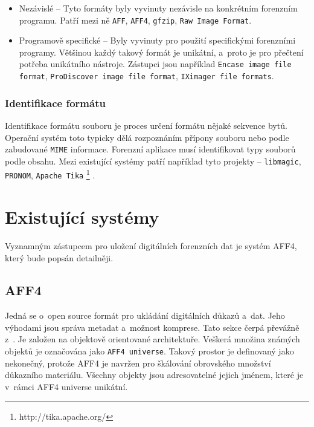 \begin{itemize}
\item Nezávislé -- Tyto formáty byly vyvinuty nezávisle na konkrétním forenzním programu. Patří mezi ně \texttt{AFF}, \texttt{AFF4}, \texttt{gfzip}, \texttt{Raw Image Format}.

\item Programově specifické -- Byly vyvinuty pro použití specifickými forenzními programy. Většinou každý takový formát je unikátní, a~proto je pro přečtení potřeba unikátního nástroje.
Zástupci jsou například \texttt{Encase image file format}, \texttt{ProDiscover image file format}, \texttt{IXimager file formats}.
\end{itemize}

\subsubsection{Identifikace formátu}
Identifikace formátu souboru je proces určení formátu nějaké sekvence bytů. Operační systém toto typicky dělá rozpoznáním přípony souboru nebo podle zabudované \texttt{MIME} informace. Forenzní aplikace musí identifikovat typy souborů podle obsahu. Mezi existující systémy patří například tyto projekty -- \texttt{libmagic}, \texttt{PRONOM}, \texttt{Apache Tika} \footnote{http://tika.apache.org/} \cite{forensicswikiFFIdentification}.

\section{Existující systémy}
Vyznamným zástupcem pro uložení digitálních forenzních dat je systém AFF4, který bude popsán detailněji.

\subsection{AFF4}
Jedná se o~open source formát pro ukládání digitálních důkazů a~dat. Jeho výhodami jsou správa metadat a~možnost komprese. Tato sekce čerpá převážně z~\cite{aff4}. Je založen na objektově orientované architektuře. Veškerá množina známých objektů je označována jako \texttt{AFF4 universe}. Takový prostor je definovaný jako nekonečný, protože AFF4 je navržen pro škálování obrovského množství důkazního materiálu. Všechny objekty jsou adresovatelné jejich jménem, které je v~rámci AFF4 universe unikátní.

\vspace{0.5cm}

